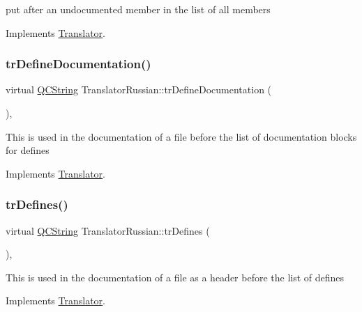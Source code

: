 put after an undocumented member in the list of all members 

Implements \mbox{\hyperlink{class_translator}{Translator}}.

\mbox{\label{class_translator_russian_a7590e4fa17f03acabd62b28faf18a1ab}} 
\subsubsection{\texorpdfstring{trDefineDocumentation()}{trDefineDocumentation()}}
{\footnotesize\ttfamily virtual \mbox{\hyperlink{class_q_c_string}{Q\+C\+String}} Translator\+Russian\+::tr\+Define\+Documentation (\begin{DoxyParamCaption}{ }\end{DoxyParamCaption})\hspace{0.3cm}{\ttfamily [inline]}, {\ttfamily [virtual]}}

This is used in the documentation of a file before the list of documentation blocks for defines 

Implements \mbox{\hyperlink{class_translator}{Translator}}.

\mbox{\label{class_translator_russian_a4418fe7caa15af92771ba113a751747a}} 
\subsubsection{\texorpdfstring{trDefines()}{trDefines()}}
{\footnotesize\ttfamily virtual \mbox{\hyperlink{class_q_c_string}{Q\+C\+String}} Translator\+Russian\+::tr\+Defines (\begin{DoxyParamCaption}{ }\end{DoxyParamCaption})\hspace{0.3cm}{\ttfamily [inline]}, {\ttfamily [virtual]}}

This is used in the documentation of a file as a header before the list of defines 

Implements \mbox{\hyperlink{class_translator}{Translator}}.

\mbox{\label{class_translator_russian_a1a039c85bbeac528245ba6f5d80b05f3}} 
